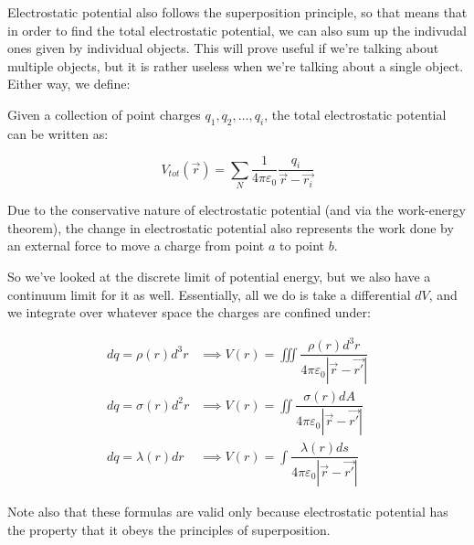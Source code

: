 \documentclass{report}
\theoremstyle{definition}
\numberwithin{equation}{section}
\numberwithin{definition}{section}
\begin{document}
    Electrostatic potential also follows the superposition principle, so that means that in order to find the total electrostatic potential, we can also sum up the indivudal ones given by individual objects. This will prove useful if we're talking about multiple objects, but it is rather useless when we're talking about a single object. Either way, we define:

    \begin{theorem}
        Given a collection of point charges $q_1, q_2, \dots, q_i$, the total electrostatic potential can be written as:

        \[V_{tot}(\vec{r}) = \sum_N \frac{1}{4\pi\varepsilon_0} \frac{q_i}{\vec{r} - \vec{r_i}}\]
    \end{theorem}

    Due to the conservative nature of electrostatic potential (and via the work-energy theorem), the change in electrostatic potential also represents the work done by an external force to move a charge from point $a$ to point $b$. 

    So we've looked at the discrete limit of potential energy, but we also have a continuum limit for it as well. Essentially, all we do is take a differential $dV$, and we integrate over whatever space the charges are confined under:

    \begin{align*}
        dq = \rho(r) d^3r &\implies V(r) = \iiint \dfrac{\rho(r) d^3 r}{4\pi\varepsilon_0|\vec{r} - \vec{r'}|}\\
        dq = \sigma(r) d^2r &\implies V(r) = \iint \dfrac{\sigma(r) dA}{4\pi\varepsilon_0|\vec{r} - \vec{r'}|}\\
        dq = \lambda(r) dr &\implies V(r) = \int \dfrac{\lambda(r) ds}{4\pi\varepsilon_0|\vec{r} - \vec{r'}|}
    \end{align*}

    Note also that these formulas are valid only because electrostatic potential has the property that it obeys the principles of superposition. 
    
\end{document}

